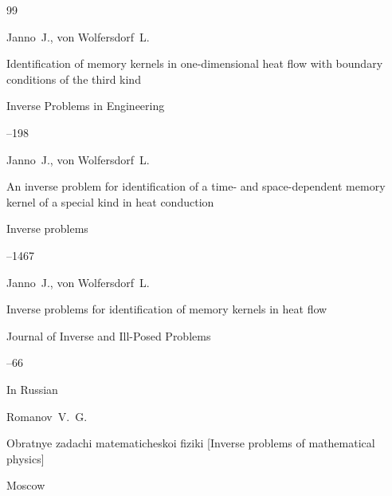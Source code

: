\begin{thebibliography}{99}

\by Janno~J., von  Wolfersdorf~L. 

\paper Identification of memory kernels in one-dimensional heat flow with boundary conditions of the third kind

\jour Inverse Problems in Engineering 




--198





\by Janno~J., von  Wolfersdorf~L. 

\paper An inverse problem for identification of a time- and space-dependent memory kernel of a special kind in heat conduction

\jour Inverse problems




--1467







\by Janno~J., von  Wolfersdorf~L. 

\paper Inverse problems for identification of memory kernels in heat flow

\jour Journal of Inverse and Ill-Posed Problems




--66











\lang In Russian 

\by Romanov~V.~G.

\book Obratnye zadachi matematicheskoi fiziki \rm [Inverse problems of mathematical physics]

\publaddr Moscow


\end{thebibliography}
